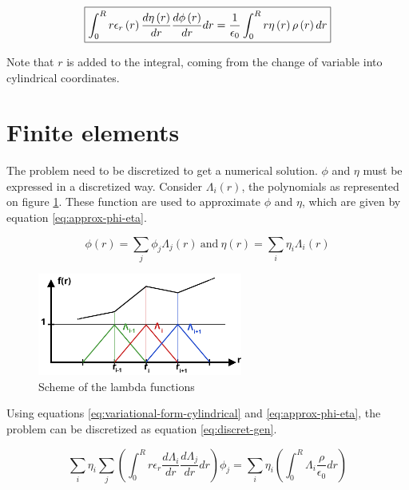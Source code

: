\documentclass[a4paper,12pt,twoside]{article}
\newcommand{\bracket}[1]{\left(#1\right)}
\begin{document}
    \begin{equation}
      \centering
      \boxed{\int_0^R r\epsilon_r\bracket{r}\frac{d\eta\bracket{r}}{dr}\frac{d\phi\bracket{r}}{dr}dr = \frac{1}{\epsilon_0}\int_0^R r\eta\bracket{r}\rho\bracket{r} dr}
      \label{eq:variational-form-cylindrical}
    \end{equation}

    Note that $r$ is added to the integral, coming from the change of variable into cylindrical coordinates.

\section{Finite elements}
  The problem need to be discretized to get a numerical solution.
  $\phi$ and $\eta$ must be expressed in a discretized way.
  Consider $\Lambda_i\bracket{r}$, the polynomials as represented on figure \ref{fig:lambda}.
  These function are used to approximate $\phi$ and $\eta$, which are given by equation \eqref{eq:approx-phi-eta}.

  \begin{equation}
    \phi\bracket{r}=\sum_j\phi_j\Lambda_j\bracket{r}~\text{and}~\eta\bracket{r}=\sum_i\eta_i\Lambda_i\bracket{r}
    \label{eq:approx-phi-eta} %
  \end{equation}

  \begin{figure}[h]
    \centering
    \includegraphics[width=0.6\textwidth]{graphs/lambda.pdf}
    \caption{Scheme of the lambda functions}
    \label{fig:lambda}
  \end{figure}

  Using equations \eqref{eq:variational-form-cylindrical} and \eqref{eq:approx-phi-eta}, the problem can be discretized as equation \eqref{eq:discret-gen}.

  \begin{equation}
    \sum_i\eta_i\sum_j\bracket{\int_0^R r\epsilon_r\frac{d\Lambda_i}{dr}\frac{d\Lambda_j}{dr}dr}\phi_j = \sum_i\eta_i\bracket{\int_0^R\Lambda_i\frac{\rho}{\epsilon_0}dr}
    \label{eq:discret-gen}
  \end{equation}
\end{document}
